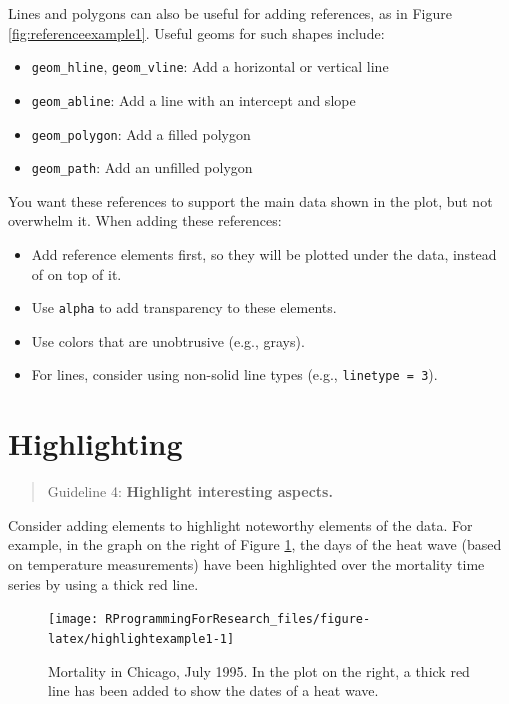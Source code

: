 \documentclass[]{book}
\providecommand{\tightlist}{%
  \setlength{\itemsep}{0pt}\setlength{\parskip}{0pt}}
\begin{document}
Lines and polygons can also be useful for adding references, as in
Figure \ref{fig:referenceexample1}. Useful geoms for such shapes
include:

\begin{itemize}
\tightlist
\item
  \texttt{geom\_hline}, \texttt{geom\_vline}: Add a horizontal or
  vertical line
\item
  \texttt{geom\_abline}: Add a line with an intercept and slope
\item
  \texttt{geom\_polygon}: Add a filled polygon
\item
  \texttt{geom\_path}: Add an unfilled polygon
\end{itemize}

You want these references to support the main data shown in the plot,
but not overwhelm it. When adding these references:

\begin{itemize}
\tightlist
\item
  Add reference elements first, so they will be plotted under the data,
  instead of on top of it.
\item
  Use \texttt{alpha} to add transparency to these elements.
\item
  Use colors that are unobtrusive (e.g., grays).
\item
  For lines, consider using non-solid line types (e.g.,
  \texttt{linetype\ =\ 3}).
\end{itemize}

\section{Highlighting}\label{highlighting}

\begin{quote}
Guideline 4: \textbf{Highlight interesting aspects.}
\end{quote}

Consider adding elements to highlight noteworthy elements of the data.
For example, in the graph on the right of Figure
\ref{fig:highlightexample1}, the days of the heat wave (based on
temperature measurements) have been highlighted over the mortality time
series by using a thick red line.

\begin{figure}

{\centering \texttt{[image: RProgrammingForResearch\_files/figure-latex/highlightexample1-1]} 

}

\caption{Mortality in Chicago, July 1995. In the plot on the right, a thick red line has been added to show the dates of a heat wave.}\label{fig:highlightexample1}
\end{figure}
\end{document}
